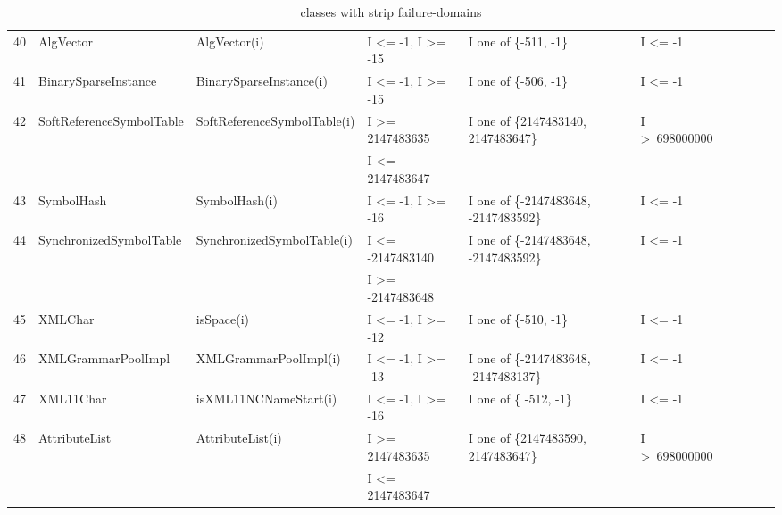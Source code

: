 \documentclass[runningheads,a4paper]{llncs}
\begin{document}
\begin{table}[h]
{{\begin{tabular}{|l|l|l|l|l|l|l|l|l|l|}
40	& AlgVector					& AlgVector(i)				& I \textless= -1, I \textgreater= -15			& I one of \{-511, -1\}					& I \textless= -1						\\ 
41	& BinarySparseInstance		& BinarySparseInstance(i)		& I \textless= -1, I \textgreater= -15			& I one of \{-506, -1\}					& I \textless= -1						\\ 
42	& SoftReferenceSymbolTable	& SoftReferenceSymbolTable(i)& I \textgreater= 2147483635					& I one of \{2147483140, 2147483647\}	& I \textgreater~698000000			\\ 
	&                                             &                                             & I \textless= 2147483647					& 										&  			   						\\	
43	& SymbolHash				& SymbolHash(i)				& I \textless= -1,  I \textgreater= -16			& I one of \{-2147483648, -2147483592\}	& I \textless= -1						\\ 
44	& SynchronizedSymbolTable	& SynchronizedSymbolTable(i) & I \textless= -2147483140					& I one of \{-2147483648, -2147483592\}	& I \textless= -1						\\ 
	&                                             &                                             & I \textgreater= -2147483648				& 										&  			   						\\
45	& XMLChar					& isSpace(i)					& I \textless= -1, I \textgreater= -12			& I one of \{-510, -1\}					& I \textless= -1						\\
46	& XMLGrammarPoolImpl		& XMLGrammarPoolImpl(i)		& I \textless= -1, I \textgreater= -13			& I one of \{-2147483648, -2147483137\}	& I \textless= -1						\\ 
47	& XML11Char				& isXML11NCNameStart(i)		& I \textless= -1, I \textgreater= -16			& I one of \{ -512, -1\}					& I \textless= -1						\\ 
48	& AttributeList				& AttributeList(i)				& I \textgreater= 2147483635				& I one of \{2147483590, 2147483647\}	& I \textgreater~698000000			\\ 
	&                                             &                                             & I \textless= 2147483647					& 										&  			   						\\	

\hline
\end{tabular}
}
}
\bigskip
\caption{classes with strip failure-domains}
\label{table:stripDomains}
\end{table}
\end{document}
